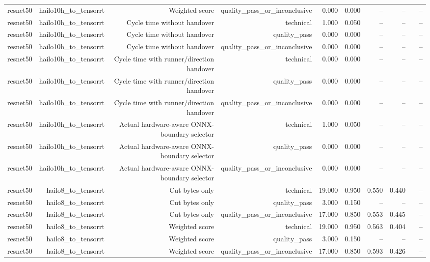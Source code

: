 \begin{table}[t]
\begin{tabular}{lrrrrrrrrr}
resnet50 & hailo10h\_to\_tensorrt & Weighted score & quality\_pass\_or\_inconclusive & 0.000 & 0.000 & -- & -- &  & -- \\
resnet50 & hailo10h\_to\_tensorrt & Cycle time without handover & technical & 1.000 & 0.050 & -- & -- &  & -- \\
resnet50 & hailo10h\_to\_tensorrt & Cycle time without handover & quality\_pass & 0.000 & 0.000 & -- & -- &  & -- \\
resnet50 & hailo10h\_to\_tensorrt & Cycle time without handover & quality\_pass\_or\_inconclusive & 0.000 & 0.000 & -- & -- &  & -- \\
resnet50 & hailo10h\_to\_tensorrt & Cycle time with runner/direction handover & technical & 0.000 & 0.000 & -- & -- &  & -- \\
resnet50 & hailo10h\_to\_tensorrt & Cycle time with runner/direction handover & quality\_pass & 0.000 & 0.000 & -- & -- &  & -- \\
resnet50 & hailo10h\_to\_tensorrt & Cycle time with runner/direction handover & quality\_pass\_or\_inconclusive & 0.000 & 0.000 & -- & -- &  & -- \\
resnet50 & hailo10h\_to\_tensorrt & Actual hardware-aware ONNX-boundary selector & technical & 1.000 & 0.050 & -- & -- &  & -- \\
resnet50 & hailo10h\_to\_tensorrt & Actual hardware-aware ONNX-boundary selector & quality\_pass & 0.000 & 0.000 & -- & -- &  & -- \\
resnet50 & hailo10h\_to\_tensorrt & Actual hardware-aware ONNX-boundary selector & quality\_pass\_or\_inconclusive & 0.000 & 0.000 & -- & -- &  & -- \\
resnet50 & hailo8\_to\_tensorrt & Cut bytes only & technical & 19.000 & 0.950 & 0.550 & 0.440 &  & -- \\
resnet50 & hailo8\_to\_tensorrt & Cut bytes only & quality\_pass & 3.000 & 0.150 & -- & -- &  & -- \\
resnet50 & hailo8\_to\_tensorrt & Cut bytes only & quality\_pass\_or\_inconclusive & 17.000 & 0.850 & 0.553 & 0.445 &  & -- \\
resnet50 & hailo8\_to\_tensorrt & Weighted score & technical & 19.000 & 0.950 & 0.563 & 0.404 &  & -- \\
resnet50 & hailo8\_to\_tensorrt & Weighted score & quality\_pass & 3.000 & 0.150 & -- & -- &  & -- \\
resnet50 & hailo8\_to\_tensorrt & Weighted score & quality\_pass\_or\_inconclusive & 17.000 & 0.850 & 0.593 & 0.426 &  & -- \\

\end{tabular}
\end{table}
